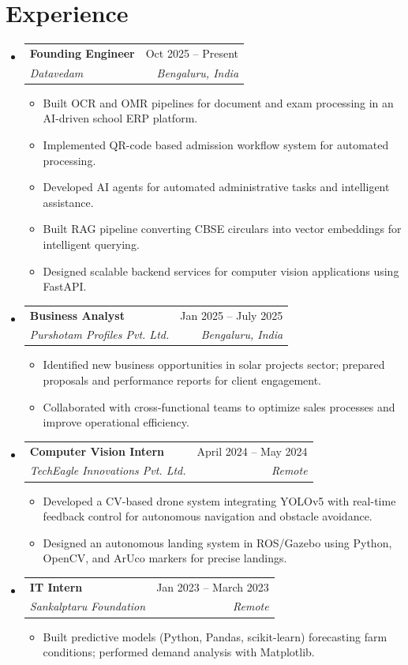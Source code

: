 \documentclass[letterpaper,10pt]{article}
\makeatletter
\newcommand{\resumeItem}[1]{
  \item\small{
    {#1 \vspace{-1pt}}
  }
}
\newcommand{\resumeSubheading}[4]{
  \vspace{-1pt}\item
    \begin{tabular*}{0.97\textwidth}[t]{l@{\extracolsep{\fill}}r}
      \textbf{#1} & #2 \\
      \textit{\small #3} & \textit{\small #4} \\
    \end{tabular*}\vspace{-5pt}
}
\newcommand{\resumeSubHeadingListStart}{\begin{itemize}[leftmargin=0.15in, label={}]}
\newcommand{\resumeSubHeadingListEnd}{\end{itemize}\vspace{-5pt}}
\newcommand{\resumeItemListStart}{\begin{itemize}\vspace{-3pt}}
\newcommand{\resumeItemListEnd}{\end{itemize}\vspace{-2pt}}
\makeatother
\begin{document}
\section{Experience}
\resumeSubHeadingListStart
    \resumeSubheading
      {Founding Engineer}{Oct 2025 -- Present}
      {Datavedam}{Bengaluru, India}
      \resumeItemListStart
        \resumeItem{Built OCR and OMR pipelines for document and exam processing in an AI-driven school ERP platform.}
        \resumeItem{Implemented QR-code based admission workflow system for automated processing.}
        \resumeItem{Developed AI agents for automated administrative tasks and intelligent assistance.}
        \resumeItem{Built RAG pipeline converting CBSE circulars into vector embeddings for intelligent querying.}
        \resumeItem{Designed scalable backend services for computer vision applications using FastAPI.}
      \resumeItemListEnd
    \resumeSubheading
      {Business Analyst}{Jan 2025 -- July 2025}
      {Purshotam Profiles Pvt. Ltd.}{Bengaluru, India}
      \resumeItemListStart
        \resumeItem{Identified new business opportunities in solar projects sector; prepared proposals and performance reports for client engagement.}
        \resumeItem{Collaborated with cross-functional teams to optimize sales processes and improve operational efficiency.}
      \resumeItemListEnd
    \resumeSubheading
      {Computer Vision Intern}{April 2024 -- May 2024}
      {TechEagle Innovations Pvt. Ltd.}{Remote}
      \resumeItemListStart
        \resumeItem{Developed a CV-based drone system integrating YOLOv5 with real-time feedback control for autonomous navigation and obstacle avoidance.}
        \resumeItem{Designed an autonomous landing system in ROS/Gazebo using Python, OpenCV, and ArUco markers for precise landings.}
      \resumeItemListEnd
    \resumeSubheading
      {IT Intern}{Jan 2023 -- March 2023}
      {Sankalptaru Foundation}{Remote}
      \resumeItemListStart
        \resumeItem{Built predictive models (Python, Pandas, scikit-learn) forecasting farm conditions; performed demand analysis with Matplotlib.}
      \resumeItemListEnd
\resumeSubHeadingListEnd
\end{document}
